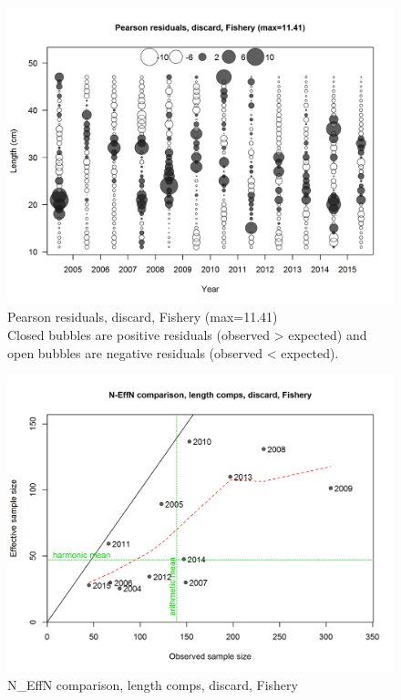 \documentclass[12pt,]{article}
\begin{document}
\begin{figure}
\centering
\includegraphics{./r4ss/plots_mod1/comp_lenfit_residsflt1mkt1.png}
\caption{Pearson residuals, discard, Fishery (max=11.41)\\
Closed bubbles are positive residuals (observed \textgreater{} expected)
and open bubbles are negative residuals (observed \textless{} expected).
\label{fig:mod1_2_comp_lenfit_residsflt1mkt1}}
\end{figure}

\begin{figure}
\centering
\includegraphics{./r4ss/plots_mod1/comp_lenfit_sampsize_flt1mkt1.png}
\caption{N\_EffN comparison, length comps, discard, Fishery
\label{fig:mod1_3_comp_lenfit_sampsize_flt1mkt1}}
\end{figure}
\end{document}
